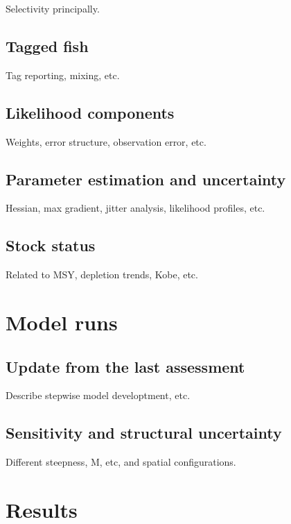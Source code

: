 \documentclass[
]{scrartcl}
\begin{document}
Selectivity principally.

\subsection{Tagged fish}\label{tagged-fish}

Tag reporting, mixing, etc.

\subsection{Likelihood components}\label{likelihood-components}

Weights, error structure, observation error, etc.

\subsection{Parameter estimation and
uncertainty}\label{parameter-estimation-and-uncertainty}

Hessian, max gradient, jitter analysis, likelihood profiles, etc.

\subsection{Stock status}\label{stock-status}

Related to MSY, depletion trends, Kobe, etc.

\section{Model runs}\label{model-runs}

\subsection{Update from the last
assessment}\label{update-from-the-last-assessment}

Describe stepwise model developtment, etc.

\subsection{Sensitivity and structural
uncertainty}\label{sensitivity-and-structural-uncertainty}

Different steepness, M, etc, and spatial configurations.

\section{Results}\label{results}
\end{document}

